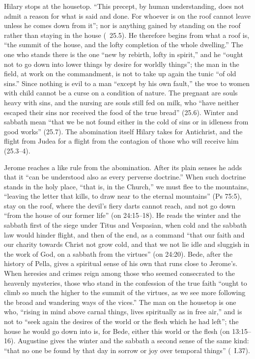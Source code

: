 Hilary stops at the housetop. ``This precept, by human understanding, does
not admit a reason for what is said and done. For whoever is on the roof
cannot leave unless he comes down from it''; nor is anything gained by
standing on the roof rather than staying in the house (~25.5). He therefore begins from what a roof is, ``the summit of the
house, and the lofty completion of the whole dwelling.'' The one who stands
there is the one ``new by rebirth, lofty in spirit,'' and he ``ought not to go
down into lower things by desire for worldly things''; the man in the field,
at work on the commandment, is not to take up again the tunic ``of old sins.''
Since nothing is evil to a man ``except by his own fault,'' the woe to women
with child cannot be a curse on a condition of nature. The pregnant are souls
heavy with sins, and the nursing are souls still fed on milk, who ``have
neither escaped their sins nor received the food of the true bread'' (25.6).
Winter and sabbath mean ``that we be not found either in the cold of sins or
in idleness from good works'' (25.7). The abomination itself Hilary takes for
Antichrist, and the flight from Judea for a flight from the contagion of those
who will receive him (25.3--4).

Jerome reaches a like rule from the abomination. After its plain senses he
adds that it ``can be understood also as every perverse doctrine.'' When such
doctrine stands in the holy place, ``that is, in the Church,'' we must flee
to the mountains, ``leaving the letter that kills, to draw near to the
eternal mountains'' (Ps 75:5), stay on the roof, where the devil's fiery darts
cannot reach, and not go down ``from the house of our former life'' (on
24:15--18). He reads the winter and the sabbath first of the siege under
Titus and Vespasian, when cold and the sabbath law would hinder flight, and
then of the end, as a command ``that our faith and our charity towards Christ
not grow cold, and that we not lie idle and sluggish in the work of God, on a
sabbath from the virtues'' (on 24:20). Bede, after the history of Pella,
gives a spiritual sense of his own that runs close to Jerome's. When heresies
and crimes reign among those who seemed consecrated to the heavenly
mysteries, those who stand in the confession of the true faith ``ought to
climb so much the higher to the summit of the virtues, as we see more
following the broad and wandering ways of the vices.'' The man on the
housetop is one who, ``rising in mind above carnal things, lives spiritually
as in free air,'' and is not to ``seek again the desires of the world or the
flesh which he had left''; the house he would go down into is, for Bede,
either this world or the flesh (on 13:15--16). Augustine gives the winter and
the sabbath a second sense of the same kind: ``that no one be found by that
day in sorrow or joy over temporal things'' (~I.37).

